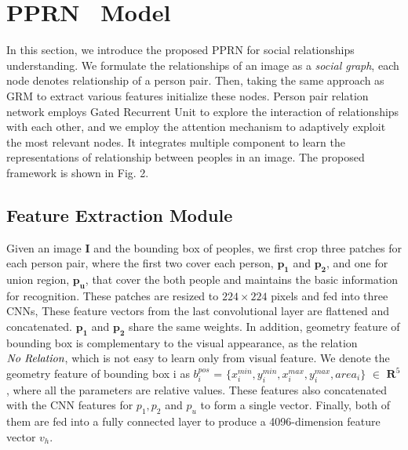 \documentclass{article}
\newcommand{\PPRN}{{\sf PPRN}}
\begin{document}
\section{PPRN \ Model}

In this section, we introduce the proposed {\PPRN} for social relationships understanding. We formulate the relationships of an image as a \emph{social graph}, each node denotes relationship of a person pair. Then, taking the same approach as GRM\cite{DBLP:conf/ijcai/WangCRYCL18} to extract various features initialize these nodes. Person pair relation  network employs Gated Recurrent Unit\cite{DBLP:conf/ssst/ChoMBB14} to explore the interaction of relationships with each other, and we employ the attention mechanism to adaptively exploit the most relevant nodes. It integrates multiple
component to learn the representations of relationship between peoples in an image.
 The proposed framework is shown in Fig. 2.

\subsection{Feature Extraction Module} \label{section:vs}

Given an image \textbf{I} and the bounding box of peoples, we first crop three patches for each person pair, where the first two cover each person, $\mathbf{p_1}$ and $\mathbf{p_2}$, and one for union region, $\mathbf{p_u}$, that cover the both people and maintains the basic information for recognition. These patches are resized to $224\times224$ pixels and fed into three CNNs, These feature vectors from the last convolutional layer are flattened and concatenated. $\mathbf{p_1}$ and $\mathbf{p_2}$ share the same weights.
In addition, geometry feature of bounding box is complementary to the visual appearance, as the relation $\emph{No Relation}$, which is not easy to learn only from visual feature. We denote the geometry feature of bounding box i as $b_i^{pos}$ = $\{x_i^{min}, y_i^{min},x_i^{max},y_i^{max},area_i\}$  $\in$ $\mathbf{R}^5$, where all the parameters are relative values. These features also concatenated with the CNN features for $p_1,p_2$ and $p_u$ to form a single vector. Finally, both of them are fed into a fully connected layer to produce a 4096-dimension feature vector $v_h$.
\end{document}
